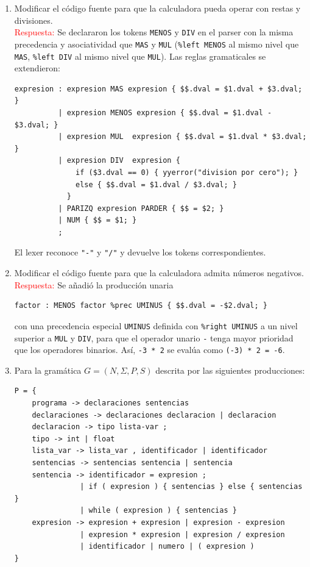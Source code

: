 \documentclass[11pt]{report}
\begin{document}
\begin{enumerate}
  \item Modificar el código fuente para que la calculadora pueda operar con restas y
  divisiones. \\
  \textcolor{red}{Respuesta:} Se declararon los tokens \texttt{MENOS} y \texttt{DIV}
  en el parser con la misma precedencia y asociatividad que \texttt{MAS} y \texttt{MUL}
  (\texttt{\%left MENOS} al mismo nivel que \texttt{MAS}, \texttt{\%left DIV} al
  mismo nivel que \texttt{MUL}).
  Las reglas gramaticales se extendieron:
  \begin{verbatim}
expresion : expresion MAS expresion { $$.dval = $1.dval + $3.dval; }
          | expresion MENOS expresion { $$.dval = $1.dval - $3.dval; }
          | expresion MUL  expresion { $$.dval = $1.dval * $3.dval; }
          | expresion DIV  expresion {
              if ($3.dval == 0) { yyerror("division por cero"); }
              else { $$.dval = $1.dval / $3.dval; }
            }
          | PARIZQ expresion PARDER { $$ = $2; }
          | NUM { $$ = $1; }
          ;
  \end{verbatim}
  El lexer reconoce \texttt{"-"} y \texttt{"/"} y devuelve los tokens correspondientes.

  \item Modificar el código fuente para que la calculadora admita números negativos. \\
  \textcolor{red}{Respuesta:} Se añadió la producción unaria
  \begin{verbatim}
factor : MENOS factor %prec UMINUS { $$.dval = -$2.dval; }
  \end{verbatim}
  con una precedencia especial \texttt{UMINUS} definida con \texttt{\%right UMINUS}
  a un nivel superior a \texttt{MUL} y \texttt{DIV}, para que el operador unario
  \texttt{-} tenga mayor prioridad que los operadores binarios. Así,
  \texttt{-3 * 2} se evalúa como \texttt{(-3) * 2 = -6}.

  \item Para la gramática $G = (N, \Sigma, P, S)$ descrita por las siguientes
  producciones:
\begin{normalsize}
\begin{verbatim}
P = {
    programa -> declaraciones sentencias
    declaraciones -> declaraciones declaracion | declaracion
    declaracion -> tipo lista-var ;
    tipo -> int | float
    lista_var -> lista_var , identificador | identificador
    sentencias -> sentencias sentencia | sentencia
    sentencia -> identificador = expresion ;
               | if ( expresion ) { sentencias } else { sentencias }
               | while ( expresion ) { sentencias }
    expresion -> expresion + expresion | expresion - expresion
               | expresion * expresion | expresion / expresion
               | identificador | numero | ( expresion )
}
\end{verbatim}
\end{normalsize}


\end{enumerate}
\end{document}
